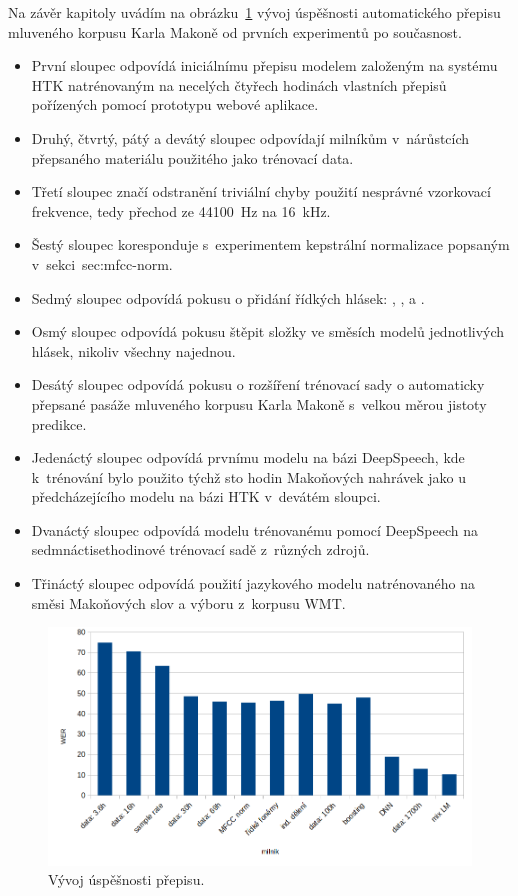 Na závěr kapitoly uvádím na obrázku~\ref{fig:asrhist} vývoj úspěšnosti
automatického přepisu mluveného korpusu Karla Makoně od prvních experimentů po
současnost.
\begin{itemize}
\item{
  První sloupec odpovídá iniciálnímu přepisu modelem založeným na
systému HTK natrénovaným na necelých čtyřech hodinách vlastních přepisů
pořízených pomocí prototypu webové aplikace.
}
\item{
  Druhý, čtvrtý, pátý a devátý sloupec odpovídají milníkům v~nárůstcích
  přepsaného materiálu použitého jako trénovací data.
}
\item{
  Třetí sloupec značí odstranění triviální chyby použití nesprávné
  vzorkovací frekvence, tedy přechod ze 44100~Hz na 16~kHz.
}
\item{
  Šestý sloupec koresponduje s~experimentem kepstrální normalizace popsaným
  v~sekci~{sec:mfcc-norm}.
}
\item{
  Sedmý sloupec odpovídá pokusu o přidání řídkých hlásek:
  , ,  a .
}
\item{
  Osmý sloupec odpovídá pokusu štěpit složky ve směsích modelů jednotlivých
  hlásek, nikoliv všechny najednou.
}
\item{
  Desátý sloupec odpovídá pokusu o rozšíření trénovací sady o automaticky
  přepsané pasáže mluveného korpusu Karla Makoně s~velkou měrou jistoty
  predikce.
}
\item{
  Jedenáctý sloupec odpovídá prvnímu modelu na bázi DeepSpeech, kde k~trénování
  bylo použito týchž sto hodin Makoňových nahrávek jako u předcházejícího modelu
  na bázi HTK v~devátém sloupci.
}
\item{
  Dvanáctý sloupec odpovídá modelu trénovanému pomocí DeepSpeech na
  sedmnáctisethodinové trénovací sadě z~různých zdrojů.
}
\item{
  Třináctý sloupec odpovídá použití jazykového modelu natrénovaného na směsi
  Makoňových slov a výboru z~korpusu WMT.
}
\end{itemize}

\begin{figure}[htpb]
\includegraphics[scale=0.43]{rc/asrhist.png}
\caption{
    Vývoj úspěšnosti přepisu.
}
\label{fig:asrhist}
\end{figure}
